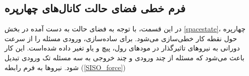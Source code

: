 \subsection{فرم خطی فضای حالت کانال‌های چهارپره}\label{lin_SISO}
در این قسمت، با توجه به فضای حالت  به دست آمده در بخش
\ref{spacestate}،
چهارپره حول نقطه کار خطی‌سازی می‌شود.
برای ساده‌سازی، ورودی مسئله را از سرعت دورانی به نیروهای تاثیرگذار در مودهای رول، پیچ و یاو تغیر داده شده‌است. این کار باعث می‌شود که مسئله از چند ورودی و چند خروجی به سه مسئله تک ورودی تبدیل شود. نیروها به فرم رابطه 
(\ref{SISO_force})
